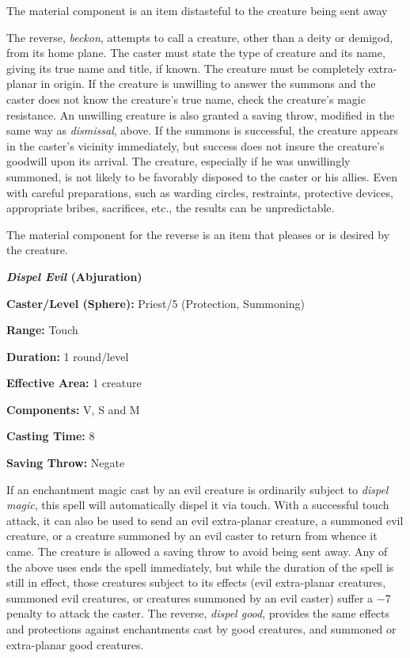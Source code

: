 \begin{multicols}{2}
The material component is an item distasteful to the creature being sent away

The reverse, \textit{beckon}, attempts to call a creature, other than a deity or demigod, from its home plane.  The caster must state the type of creature and its name, giving its true name and title, if known.  The creature must be completely extra-planar in origin.  If the creature is unwilling to answer the summons and the caster does not know the creature's true name, check the creature's magic resistance.  An unwilling creature is also granted a saving throw, modified in the same way as \textit{dismissal}, above.  If the summons is successful, the creature appears in the caster's vicinity immediately, but success does not insure the creature's goodwill upon its arrival.  The creature, especially if he was unwillingly summoned, is not likely to be favorably disposed to the caster or his allies.  Even with careful preparations, such as warding circles, restraints, protective devices, appropriate bribes, sacrifices, etc., the results can be unpredictable.

The material component for the reverse is an item that pleases or is desired by the creature.

\vspace{1em}

\noindent
\begin{minipage}{\columnwidth}

\noindent \textbf{\textit{Dispel Evil} (Abjuration)}

\noindent \textbf{Caster/Level (Sphere):} Priest/5 (Protection, Summoning)

\noindent \textbf{Range:} Touch

\noindent \textbf{Duration:} 1 round/level

\noindent \textbf{Effective Area:} 1 creature

\noindent \textbf{Components:} V, S and M

\noindent \textbf{Casting Time:} 8

\noindent \textbf{Saving Throw:} Negate

\end{minipage}

If an enchantment magic cast by an evil creature is ordinarily subject to \textit{dispel magic}, this spell will automatically dispel it via touch.  With a successful touch attack, it can also be used to send an evil extra-planar creature, a summoned evil creature, or a creature summoned by an evil caster to return from whence it came.  The creature is allowed a saving throw to avoid being sent away.  Any of the above uses ends the spell immediately, but while the duration of the spell is still in effect, those creatures subject to its effects (evil extra-planar creatures, summoned evil creatures, or creatures summoned by an evil caster) suffer a $-7$ penalty to attack the caster.  The reverse, \textit{dispel good}, provides the same effects and protections against enchantments cast by good creatures, and summoned or extra-planar good creatures.


\end{multicols}
